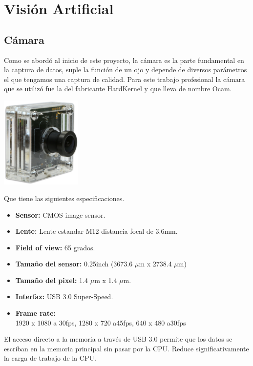\chapter{Visión Artificial}

\section{Cámara}
Como se abordó al inicio de este proyecto, la cámara es la parte fundamental en
la captura de datos, suple la función de un ojo y depende de diversos
parámetros el que tengamos una captura de calidad. Para este trabajo profesional
la cámara que se utilizó fue la del fabricante HardKernel y que lleva de nombre
Ocam.
\begin{center}
	\includegraphics[width=0.3\textwidth]{Contenido/Cuerpo/Capitulo4/Fig0_1.eps}
	\label{Fig1}
\end{center}
Que tiene las siguientes especificaciones.
\begin{itemize}
	\item \textbf{Sensor:} CMOS image sensor.
	\item \textbf{Lente: } Lente estandar M12 distancia focal de 3.6mm.
	\item \textbf{Field of view: } 65 grados.
	\item \textbf{Tamaño del sensor: }0.25inch (3673.6 $\mu$m x 2738.4 $\mu$m)
	\item \textbf{Tamaño del pixel: } 1.4 $\mu$m x 1.4 $\mu$m.
	\item \textbf{Interfaz: }USB 3.0 Super-Speed.
	\item \textbf{Frame rate: }\\
	      1920 x 1080 a 30fps, 1280 x 720 a45fps, 640 x 480 a30fps
\end{itemize}
El acceso directo a la memoria a través de USB 3.0 permite que los datos se
escriban en la memoria principal sin pasar por la CPU. Reduce significativamente
la carga de trabajo de la CPU.


